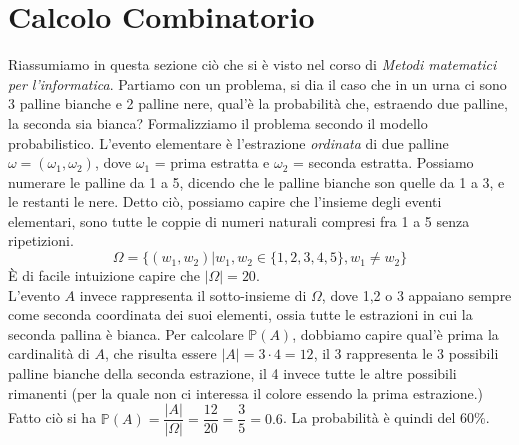 \documentclass[12pt, letterpaper]{article}
\begin{document}
\section{Calcolo Combinatorio}
Riassumiamo in questa sezione ciò che si è visto nel corso di \textit{Metodi matematici per l'informatica}. Partiamo
con un problema, si dia il caso che in un urna ci sono 3 palline bianche e 2 palline nere, qual'è la probabilità che, 
estraendo due palline, la seconda sia bianca? Formalizziamo il problema secondo il modello probabilistico.
L'evento elementare è l'estrazione \textit{ordinata} di due palline \(\omega=(\omega_1,\omega_2)\), dove 
\(\omega_1\) = prima estratta e \(\omega_2\) = seconda estratta. Possiamo numerare le palline da 1 a 5, 
dicendo che le palline bianche son quelle da 1 a 3, e le restanti le nere. Detto ciò, possiamo capire che l'insieme 
degli eventi elementari, sono tutte le coppie di numeri naturali compresi fra 1 a 5 senza ripetizioni.
\begin{equation}
    \Omega = \{(w_1,w_2) | w_1,w_2 \in \{1,2,3,4,5\}, w_1 \ne w_2\}
\end{equation}
È di facile intuizione capire che \(|\Omega|=20\).\\
L'evento \(A\) invece rappresenta il sotto-insieme di \(\Omega\), dove 1,2 o 3 appaiano sempre come seconda 
coordinata dei suoi elementi, ossia tutte le estrazioni in cui la seconda pallina è bianca. Per calcolare \(\mathbb{P}(A)\),
dobbiamo capire qual'è prima la cardinalità di \(A\), che risulta essere \(|A|=3\cdot 4 = 12\), il 3 rappresenta 
le 3 possibili palline bianche della seconda estrazione, il 4 invece tutte le altre possibili rimanenti (per
 la quale non ci interessa il colore essendo la prima estrazione.) Fatto ciò si ha \(\mathbb{P}(A)=\dfrac{|A|}{|\Omega|}=\dfrac{12}{20}=\dfrac{3}{5}=0.6\). La 
 probabilità è quindi del 60\%.
\end{document}
